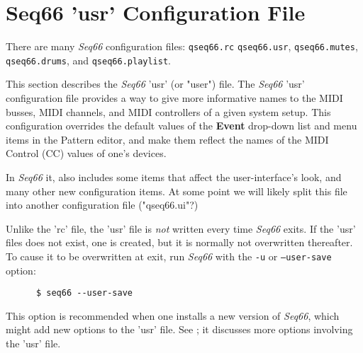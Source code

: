 %
%
%

\section{Seq66 'usr' Configuration File}
\label{sec:usr_file}

   There are many \textsl{Seq66} configuration files:
   \texttt{qseq66.rc}
   \texttt{qseq66.usr},
   \texttt{qseq66.mutes},
   \texttt{qseq66.drums}, and
   \texttt{qseq66.playlist}.


   This section describes the \textsl{Seq66} 'usr' (or "user") file.
   The \textsl{Seq66} 'usr'
   configuration file provides a way to give more
   informative names to the MIDI busses, MIDI channels, and MIDI controllers of
   a given system setup.  This configuration overrides the default values
   of the \textbf{Event} drop-down list and menu items in the Pattern editor,
   and make them reflect the names of the MIDI Control (CC) values of one's
   devices.

   In \textsl{Seq66} it, also includes some items that affect the
   user-interface's look, and many other new configuration items.
   At some point we will likely split this file into another configuration file
   ("qseq66.ui"?)

   Unlike the 'rc' file, the 'usr' file is \textsl{not} written every time
   \textsl{Seq66} exits.  If the 'usr' files does not exist, one is
   created, but it is normally not overwritten thereafter.  To
   cause it to be overwritten at exit, run \textsl{Seq66} with the
   \texttt{-u} or \texttt{--user-save} option:

   \begin{verbatim}
      $ seq66 --user-save
   \end{verbatim}

   This option is recommended when one installs a new version of
   \textsl{Seq66}, which might add new options to the 'usr' file.
   See ; it discusses more options involving the
   'usr' file.

